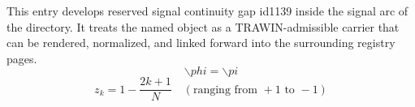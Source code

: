 
\begin{tzpsnapshot}
\end{tzpsnapshot}

This entry develops reserved signal continuity gap id1139 inside the signal arc of the directory. It treats the named object as a TRAWIN-admissible carrier that can be rendered, normalized, and linked forward into the surrounding registry pages.
\[
\backslash phi=\backslash pi
\]
\[
z_k = 1 - \frac{2k+1}{N} \quad (\text{ranging from } +1 \text{ to } -1)
\]

